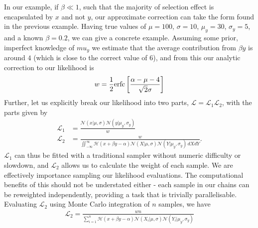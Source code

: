 \documentclass[a4paper,fleqn,usenatbib]{mnras}
\begin{document}
In our example, if $\beta \ll 1$, such that the majority of selection effect is encapsulated by $x$ and not $y$, our approximate correction can take the form found in the previous example. Having true values of $\mu = 100$, $\sigma = 10$, $\mu_y = 30$, $\sigma_y = 5$, and a known $\beta = 0.2$, we can give a concrete example. Assuming some prior, imperfect knowledge of $mu_y$  we estimate that the average contribution from $\beta y$ is around $4$ (which is close to the correct value of $6$), and from this our analytic correction to our likelihood is
\begin{align}
w = \frac{1}{2} {\rm erfc}\left[ \frac{\alpha - \mu - 4}{\sqrt{2}\sigma} \right]
\end{align}
Further, let us explicitly break our likelihood into two parts, $\mathcal{L} = \mathcal{L}_1 \mathcal{L}_2$, with the parts given by
\begin{align}
\mathcal{L}_1 &= \frac{ \mathcal{N}(x|\mu, \sigma) \mathcal{N}(y|\mu_y, \sigma_y)}{w} \\
\mathcal{L}_2 &= \frac{ w }{\iint_{-\infty}^\infty \mathcal{H}(x + \beta y - \alpha) \mathcal{N}(X|\mu, \sigma) \mathcal{N}(Y|\mu_y, \sigma_y)\, dX dY}.
\end{align}
$\mathcal{L}_1$ can thus be fitted with a traditional sampler without numeric difficulty or slowdown, and $\mathcal{L}_2$ allows us to calculate the weight of each sample. We are effectively importance sampling our likelihood evaluations. The computational benefits of this should not be understated either - each sample in our chains can be reweighted independently, providing a task that is trivially parallelisable. Evaluating $\mathcal{L}_2$ using Monte Carlo integration of $n$ samples, we have
\begin{align}
\mathcal{L}_2 = \frac{ w n }{\sum_{i=1}^{n} \mathcal{H}(x + \beta y - \alpha) \mathcal{N}(X_i|\mu, \sigma) \mathcal{N}(Y_i|\mu_y, \sigma_y)}
\end{align}
\end{document}
